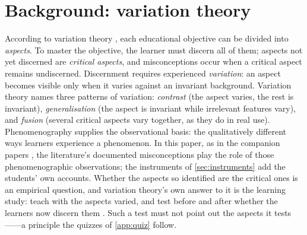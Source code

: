 \mode*
\section{Background: variation theory}

According to variation theory \autocite[Ch.~2]{NCOL}, each educational
objective can be divided into \emph{aspects}.
To master the objective, the learner must discern all of them; aspects not
yet discerned are \emph{critical aspects}, and misconceptions occur when a
critical aspect remains undiscerned.
Discernment requires experienced \emph{variation}: an aspect becomes visible
only when it varies against an invariant background.
Variation theory names three patterns of variation:
\emph{contrast} (the aspect varies, the rest is invariant),
\emph{generalisation} (the aspect is invariant while irrelevant features
vary), and
\emph{fusion} (several critical aspects vary together, as they do in real
use).
Phenomenography \autocite{Phenomenography,Neuman1987} supplies the
observational basis: the qualitatively different ways learners experience a
phenomenon.
In this paper, as in the companion papers
\autocite{VTProgMisconceptions,VTDebug}, the literature's documented
misconceptions play the role of those phenomenographic observations; the
instruments of \cref{sec:instruments} add the students' own accounts.
Whether the aspects so identified are the critical ones is an empirical
question, and variation theory's own answer to it is the learning study:
teach with the aspects varied, and test before and after whether the
learners now discern them \autocite[Ch.~7]{NCOL}\autocite{PangMarton2005,Kullberg2017ZDM}.
Such a test must not point out the aspects it tests------a principle the quizzes of \cref{app:quiz} follow.


